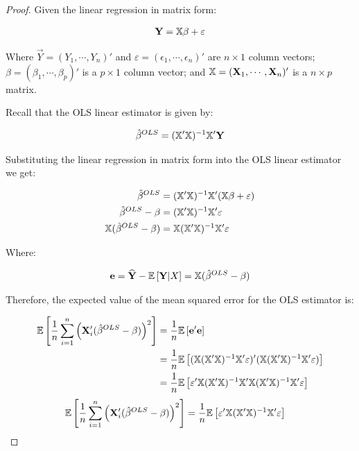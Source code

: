 \begin{proof}

Given the linear regression in matrix form:

\begin{align*}
    \mathbf{Y} = \mathbb{X}\beta + \varepsilon
\end{align*}

Where $\Vec{Y} = (Y_1, \cdots, Y_n)'$ and $\varepsilon = (\epsilon_1, \cdots, \epsilon_n)'$ are $n \times 1$ column vectors; $\beta = (\beta_1, \cdots, \beta_p)'$ is a $p \times 1$ column vector; and $\mathbb{X} = (\mathbf{X}_1, \cdots, \mathbf{X}_n)'$ is a $n \times p$ matrix.

Recall that the OLS linear estimator is given by:

\begin{align*}
    \hat{\beta}^{OLS} = (\mathbb{X}'\mathbb{X})^{-1}\mathbb{X}'\mathbf{Y}
\end{align*}

Substituting the linear regression in matrix form into the OLS linear estimator we get:

\begin{align*}
    \hat{\beta}^{OLS} &= (\mathbb{X}'\mathbb{X})^{-1}\mathbb{X}'(\mathbb{X}\beta + \varepsilon) \\
    \hat{\beta}^{OLS} - \beta &= (\mathbb{X}'\mathbb{X})^{-1}\mathbb{X}'\varepsilon \\
    \mathbb{X}(\hat{\beta}^{OLS} - \beta) &= \mathbb{X}(\mathbb{X}'\mathbb{X})^{-1}\mathbb{X}'\varepsilon \\
\end{align*}

Where: 

\begin{align*}
    \mathbf{e} = \widehat{\mathbf{Y}} - \mathbb{E}\left[\mathbf{Y} | X\right] = \mathbb{X}(\hat{\beta}^{OLS} - \beta) 
\end{align*}

Therefore, the expected value of the mean squared error for the OLS estimator is:

\begin{align*}
\mathbb{E}\left[
    \frac{1}{n}
    \sum_{i=1}^{n} \left(\mathbf{X}_i' 
        (\hat{\beta}^{OLS} - \beta)
    \right)^2
\right]
&=
\frac{1}{n} \mathbb{E}\left[
    \mathbf{e}'\mathbf{e}
\right]\\
&= \frac{1}{n} \mathbb{E}\left[
    (\mathbb{X}(\mathbb{X}'\mathbb{X})^{-1}\mathbb{X}'\varepsilon)'(\mathbb{X}(\mathbb{X}'\mathbb{X})^{-1}\mathbb{X}'\varepsilon)
\right]\\
&= \frac{1}{n} \mathbb{E}\left[
    \varepsilon'\mathbb{X}(\mathbb{X}'\mathbb{X})^{-1}\mathbb{X}'\mathbb{X}(\mathbb{X}'\mathbb{X})^{-1}\mathbb{X}'\varepsilon
\right]\\
\end{align*}
\begin{align}
\mathbb{E}\left[
    \frac{1}{n}
    \sum_{i=1}^{n} \left(\mathbf{X}_i' 
        (\hat{\beta}^{OLS} - \beta)
    \right)^2
\right]
&= \frac{1}{n} \mathbb{E}\left[
    \varepsilon'\mathbb{X}(\mathbb{X}'\mathbb{X})^{-1}\mathbb{X}'\varepsilon
\right]
\label{eq:expected-value-mse}
\end{align}


\end{proof}
